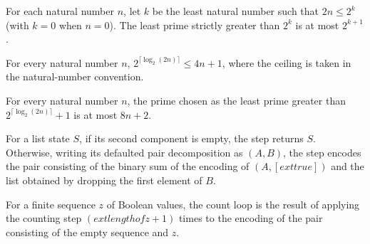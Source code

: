 \begin{theorem}
\label{Complexity.BinArith.lovaszPrime_le}
\leanok
{}
For each natural number $n$, let $k$ be the least natural number such that $2n\le2^k$ (with $k=0$ when $n=0$). The least prime strictly greater than $2^k$ is at most $2^{k+1}$.
\end{theorem}

\begin{theorem}
\label{Complexity.BinArith.two_pow_clog_le}
\leanok
{}
For every natural number $n$, $2^{\lceil\log_2(2n)\rceil} \le 4n+1$, where the ceiling
is taken in the natural-number convention.
\end{theorem}

\begin{theorem}
\label{Complexity.BinArith.lovaszPrime_le_linear}
\leanok
{}
For every natural number $n$, the prime chosen as the least prime greater than
$2^{\lceil\log_2(2n)\rceil}+1$ is at most $8n+2$.
\end{theorem}

\begin{definition}
\label{Complexity.BinArith.countStep}
\leanok
{}
For a list state $S$, if its second component is empty, the step returns $S$. Otherwise,
writing its defaulted pair decomposition as $(A,B)$, the step encodes the pair
consisting of the binary sum of the encoding of $(A,[	ext{true}])$ and the list obtained
by dropping the first element of $B$.
\end{definition}

\begin{definition}
\label{Complexity.BinArith.countLoop}
\leanok
{}
For a finite sequence $z$ of Boolean values, the count loop is the result of applying
the counting step $(	ext{length of }z+1)$ times to the encoding of the pair consisting
of the empty sequence and $z$.
\end{definition}

